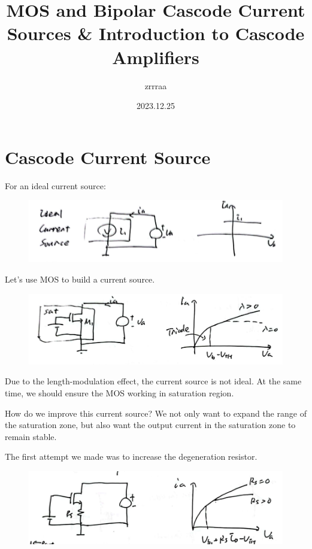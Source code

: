 \documentclass[fontset=windows]{article}
\title{\heiti\zihao{2} MOS and Bipolar Cascode Current Sources \& Introduction to Cascode Amplifiers}
\author{\songti zrrraa}
\date{2023.12.25}
\begin{document}
\maketitle
\thispagestyle{empty}

\section*{Cascode Current Source}

For an ideal current source: 

\begin{figure}[htbp]
    \centering
    \includegraphics[scale=0.7]{1.jpg}
    \captionsetup{labelformat=empty}
    \caption{}
    \label{1}
\end{figure}

Let's use MOS to build a current source. 

\begin{figure}[htbp]
    \centering
    \includegraphics[scale=0.7]{2.jpg}
    \captionsetup{labelformat=empty}
    \caption{}
    \label{2}
\end{figure}

Due to the length-modulation effect, the current source is not ideal. At the same time, we should ensure the MOS working in saturation region. 

How do we improve this current source? We not only want to expand the range of the saturation zone, but also want the output current in the saturation zone to remain stable. 

The first attempt we made was to increase the degeneration resistor. 

\begin{figure}[htbp]
    \centering
    \includegraphics[scale=0.7]{3.jpg}
    \captionsetup{labelformat=empty}
    \caption{}
    \label{3}
\end{figure}
\end{document}
